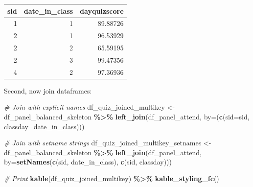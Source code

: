 \documentclass[
]{book}
\newenvironment{Shaded}{\begin{snugshade}}{\end{snugshade}}
\newcommand{\CommentTok}[1]{\textcolor[rgb]{0.56,0.35,0.01}{\textit{#1}}}
\newcommand{\DataTypeTok}[1]{\textcolor[rgb]{0.13,0.29,0.53}{#1}}
\newcommand{\KeywordTok}[1]{\textcolor[rgb]{0.13,0.29,0.53}{\textbf{#1}}}
\newcommand{\NormalTok}[1]{#1}
\newcommand{\OperatorTok}[1]{\textcolor[rgb]{0.81,0.36,0.00}{\textbf{#1}}}
\newcommand{\StringTok}[1]{\textcolor[rgb]{0.31,0.60,0.02}{#1}}
\begin{document}
\begin{table}[!h]
\centering
\begin{tabular}{r|r|r}
\hline
sid & date\_in\_class & dayquizscore\\
\hline
\rowcolor{gray!6}  1 & 1 & 89.88726\\
\hline
2 & 1 & 96.53929\\
\hline
\rowcolor{gray!6}  2 & 2 & 65.59195\\
\hline
2 & 3 & 99.47356\\
\hline
\rowcolor{gray!6}  4 & 2 & 97.36936\\
\hline
\end{tabular}
\end{table}

Second, now join dataframes:

\begin{Shaded}
\begin{Highlighting}[]
\CommentTok{\# Join with explicit names}
\NormalTok{df\_quiz\_joined\_multikey \textless{}{-}}\StringTok{ }\NormalTok{df\_panel\_balanced\_skeleton }\OperatorTok{\%\textgreater{}\%}
\StringTok{  }\KeywordTok{left\_join}\NormalTok{(df\_panel\_attend,}
            \DataTypeTok{by=}\NormalTok{(}\KeywordTok{c}\NormalTok{(}\StringTok{\textquotesingle{}sid\textquotesingle{}}\NormalTok{=}\StringTok{\textquotesingle{}sid\textquotesingle{}}\NormalTok{, }\StringTok{\textquotesingle{}classday\textquotesingle{}}\NormalTok{=}\StringTok{\textquotesingle{}date\_in\_class\textquotesingle{}}\NormalTok{)))}

\CommentTok{\# Join with setname strings}
\NormalTok{df\_quiz\_joined\_multikey\_setnames \textless{}{-}}\StringTok{ }\NormalTok{df\_panel\_balanced\_skeleton }\OperatorTok{\%\textgreater{}\%}
\StringTok{  }\KeywordTok{left\_join}\NormalTok{(df\_panel\_attend, }\DataTypeTok{by=}\KeywordTok{setNames}\NormalTok{(}\KeywordTok{c}\NormalTok{(}\StringTok{\textquotesingle{}sid\textquotesingle{}}\NormalTok{, }\StringTok{\textquotesingle{}date\_in\_class\textquotesingle{}}\NormalTok{), }\KeywordTok{c}\NormalTok{(}\StringTok{\textquotesingle{}sid\textquotesingle{}}\NormalTok{, }\StringTok{\textquotesingle{}classday\textquotesingle{}}\NormalTok{)))}

\CommentTok{\# Print}
\KeywordTok{kable}\NormalTok{(df\_quiz\_joined\_multikey) }\OperatorTok{\%\textgreater{}\%}
\StringTok{  }\KeywordTok{kable\_styling\_fc}\NormalTok{()}
\end{Highlighting}
\end{Shaded}
\end{document}
